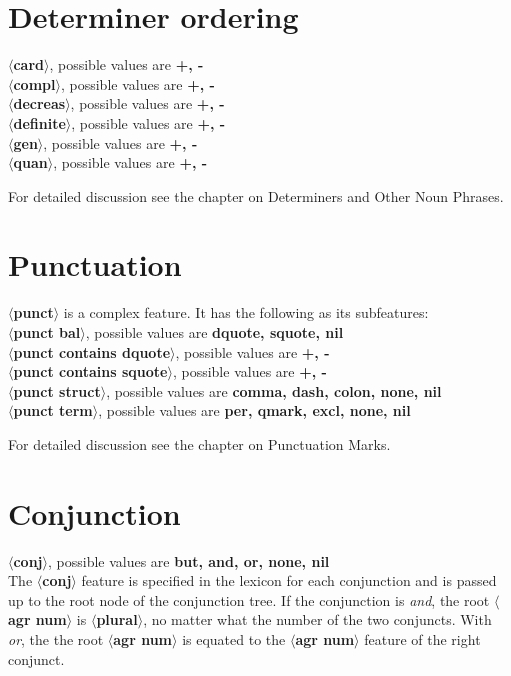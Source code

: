\section{Determiner ordering}
{\bf $\langle$card$\rangle$}, possible values are {\bf +, -}\\
{\bf $\langle$compl$\rangle$}, possible values are {\bf +, -}\\
{\bf $\langle$decreas$\rangle$}, possible values are {\bf +, -}\\
{\bf $\langle$definite$\rangle$}, possible values are {\bf +, -}\\
{\bf $\langle$gen$\rangle$}, possible values are {\bf +, -}\\
{\bf $\langle$quan$\rangle$}, possible values are {\bf +, -}

For detailed discussion see the chapter on Determiners and Other
Noun Phrases.

\section{Punctuation}
{\bf $\langle$punct$\rangle$} is a complex feature. It has the following
as its subfeatures:\\
{\bf $\langle$punct bal$\rangle$}, possible values are {\bf dquote, squote, nil}\\
{\bf $\langle$punct contains dquote$\rangle$}, possible values are {\bf +, -}\\
{\bf $\langle$punct contains squote$\rangle$}, possible values are {\bf +, -}\\
{\bf $\langle$punct struct$\rangle$}, possible values are {\bf comma, dash, colon, 
none, nil}\\
{\bf $\langle$punct term$\rangle$}, possible values are {\bf per, qmark, excl, 
none, nil}

For detailed discussion see the chapter on Punctuation Marks.


\section{Conjunction}
{\bf $\langle$conj$\rangle$}, possible values are {\bf but, and, or, none, nil}\\
The {\bf $\langle$conj$\rangle$} feature is specified in the lexicon
for each conjunction and is passed up to the root node 
of the conjunction tree. If the conjunction is {\em and}, the 
root {\bf $\langle$agr num$\rangle$} is {\bf $\langle$plural$\rangle$}, no
matter what the number of the two conjuncts. With {\em or}, the
the root {\bf $\langle$agr num$\rangle$} is equated to the
{\bf $\langle$agr num$\rangle$} feature of the right conjunct. 


